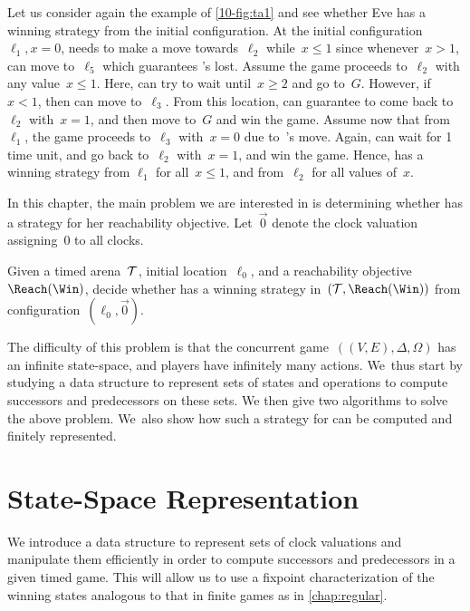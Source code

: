 \begin{example}
Let us consider again the example of \cref{10-fig:ta1} and see whether Eve
has a winning strategy from the initial configuration.
At the initial configuration~$\ell_1,x=0$, \Eve needs to make a move towards~$\ell_2$
while~$x\leq 1$ since whenever~$x>1$, \Adam can move to~$\ell_5$ which guarantees \Eve's lost.
Assume the game proceeds to~$\ell_2$ with any value~$x\leq 1$. Here, \Eve can try to wait
until~$x\geq 2$ and go to~$G$. However, if~$x<1$, then \Adam can move to~$\ell_3$.
From this location, \Eve can guarantee to come back to~$\ell_2$ with~$x=1$, and then move to~$G$ and win the game.
Assume now that from~$\ell_1$, the game proceeds to~$\ell_3$ with~$x=0$ due to~\Adam's move.
Again, \Eve can wait for 1 time unit, and go back to~$\ell_2$ with~$x=1$, and win the game.
%
Hence, \Eve has a winning strategy from $\ell_1$ for all~$x\leq 1$, and from~$\ell_2$
for all values of~$x$.
\end{example}


In this chapter, the main problem we are interested in is determining
whether \Eve has a strategy for her reachability objective.
Let~$\vec{0}$ denote the clock valuation assigning~$0$ to all clocks.

\begin{problem}
  Given a timed arena~$\mathcal T$, initial location~$\ell_0$, and a
  reachability objective~$\Reach(\Win)$,
  decide whether \Eve has a
  winning strategy in~$(\calT,\Reach(\Win))$ from
  configuration~$(\ell_0,\vec{0})$.
\end{problem}

The difficulty of this problem is that the concurrent
game~$((V,E),\Delta,\Omega)$ has an infinite state-space, and players
have infinitely many actions.  We~thus start by studying a data
structure to represent sets of states and operations to compute
successors and predecessors on these sets.  We then give two
algorithms to solve the above problem.  We~also show how such a
strategy for \Eve can be computed and finitely represented.


\section{State-Space Representation}
We introduce a data structure to represent sets of clock
valuations and manipulate them efficiently in order to compute
successors and predecessors in a given timed game. This will allow us
to use a fixpoint characterization of the winning states analogous to
that in finite games as in \cref{chap:regular}. %

